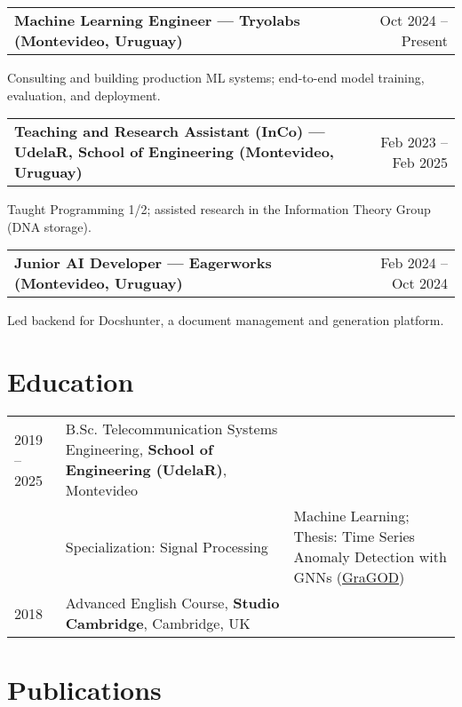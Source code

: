 \documentclass[a4paper,12pt]{article}
\makeatletter
\newenvironment{jobshort}[2]
    {
    \begin{tabularx}{\linewidth}{@{}l X r@{}}
    \textbf{#1} & \hfill &  #2 \\[3.75pt]
    \end{tabularx}
    }
    {
    }
\makeatother
\begin{document}
\begin{jobshort}{Machine Learning Engineer — Tryolabs (Montevideo, Uruguay)}{Oct 2024 -- Present}
Consulting and building production ML systems; end-to-end model training, evaluation, and deployment.
\end{jobshort}

\begin{jobshort}{Teaching and Research Assistant (InCo) — UdelaR, School of Engineering (Montevideo, Uruguay)}{Feb 2023 -- Feb 2025}
Taught Programming 1/2; assisted research in the Information Theory Group (DNA storage).
\end{jobshort}

\begin{jobshort}{Junior AI Developer — Eagerworks (Montevideo, Uruguay)}{Feb 2024 -- Oct 2024}
Led backend for Docshunter, a document management and generation platform.
\end{jobshort}

\section{Education}
\begin{tabularx}{\linewidth}{@{}l X@{}} 	
2019 -- 2025 & B.Sc. Telecommunication Systems Engineering, \textbf{School of Engineering (UdelaR)}, Montevideo \\
& Specialization: Signal Processing & Machine Learning; Thesis: Time Series Anomaly Detection with GNNs (\href{https://github.com/GraGODs/GraGOD}{GraGOD}) \\
2018 & Advanced English Course, \textbf{Studio Cambridge}, Cambridge, UK \\
\end{tabularx}

\section{Publications}
\begin{refsection}
\nocite{*}
\printbibliography[heading=none]
\end{refsection}
\end{document}
